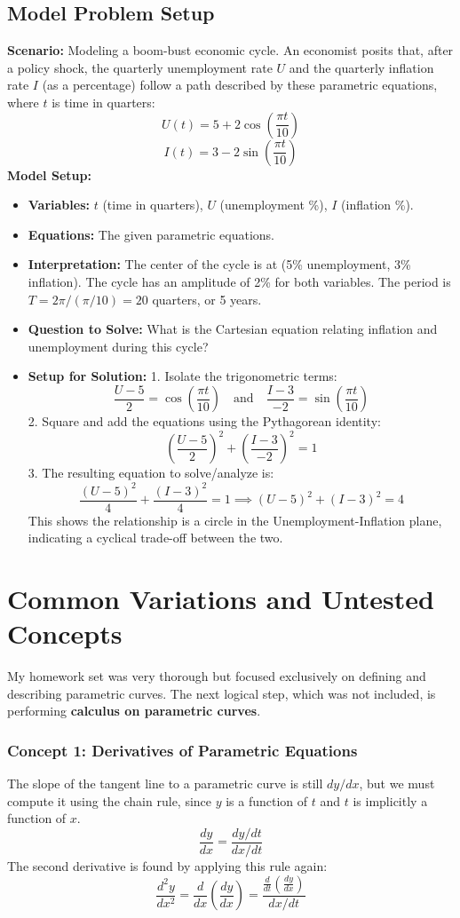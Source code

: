 \documentclass{article}
\begin{document}
\subsection{Model Problem Setup}
\textbf{Scenario:} Modeling a boom-bust economic cycle. An economist posits that, after a policy shock, the quarterly unemployment rate \(U\) and the quarterly inflation rate \(I\) (as a percentage) follow a path described by these parametric equations, where \(t\) is time in quarters:
\[
U(t) = 5 + 2\cos\left(\frac{\pi t}{10}\right)
\]
\[
I(t) = 3 - 2\sin\left(\frac{\pi t}{10}\right)
\]
\textbf{Model Setup:}
\begin{itemize}
    \item \textbf{Variables:} \(t\) (time in quarters), \(U\) (unemployment \%), \(I\) (inflation \%).
    \item \textbf{Equations:} The given parametric equations.
    \item \textbf{Interpretation:} The center of the cycle is at (5\% unemployment, 3\% inflation). The cycle has an amplitude of 2\% for both variables. The period is \(T = 2\pi / (\pi/10) = 20\) quarters, or 5 years.
    \item \textbf{Question to Solve:} What is the Cartesian equation relating inflation and unemployment during this cycle?
    \item \textbf{Setup for Solution:}
    1. Isolate the trigonometric terms:
       \[ \frac{U-5}{2} = \cos\left(\frac{\pi t}{10}\right) \quad \text{and} \quad \frac{I-3}{-2} = \sin\left(\frac{\pi t}{10}\right) \]
    2. Square and add the equations using the Pythagorean identity:
       \[ \left(\frac{U-5}{2}\right)^2 + \left(\frac{I-3}{-2}\right)^2 = 1 \]
    3. The resulting equation to solve/analyze is:
       \[ \frac{(U-5)^2}{4} + \frac{(I-3)^2}{4} = 1 \implies (U-5)^2 + (I-3)^2 = 4 \]
    This shows the relationship is a circle in the Unemployment-Inflation plane, indicating a cyclical trade-off between the two.
\end{itemize}

\section{Common Variations and Untested Concepts}
My homework set was very thorough but focused exclusively on defining and describing parametric curves. The next logical step, which was not included, is performing \textbf{calculus on parametric curves}.

\subsubsection{Concept 1: Derivatives of Parametric Equations}
The slope of the tangent line to a parametric curve is still \(dy/dx\), but we must compute it using the chain rule, since \(y\) is a function of \(t\) and \(t\) is implicitly a function of \(x\).
\[ \frac{dy}{dx} = \frac{dy/dt}{dx/dt} \]
The second derivative is found by applying this rule again:
\[ \frac{d^2y}{dx^2} = \frac{d}{dx}\left(\frac{dy}{dx}\right) = \frac{\frac{d}{dt}\left(\frac{dy}{dx}\right)}{dx/dt} \]
\end{document}

